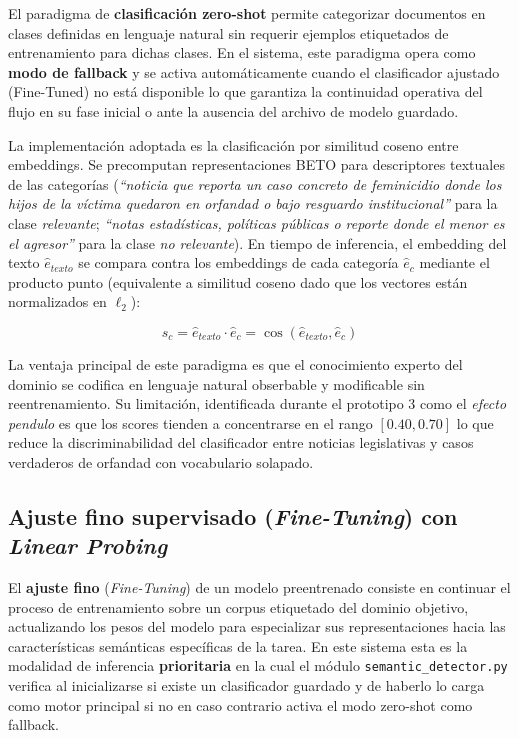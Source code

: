 El paradigma de \textbf{clasificación zero-shot} \cite{yin2019benchmarking} permite
categorizar documentos en clases definidas en lenguaje natural sin requerir
ejemplos etiquetados de entrenamiento para dichas clases. En el sistema, este
paradigma opera como \textbf{modo de fallback} y se activa automáticamente cuando
el clasificador ajustado (Fine-Tuned) no está disponible lo que garantiza la
continuidad operativa del flujo en su fase inicial o ante la ausencia del
archivo de modelo guardado.

La implementación adoptada es la clasificación por similitud coseno entre embeddings.
Se precomputan representaciones BETO para descriptores textuales de las categorías
(\textit{``noticia que reporta un caso concreto de feminicidio donde los hijos de
la víctima quedaron en orfandad o bajo resguardo institucional''} para la clase
\textit{relevante}; \textit{``notas estadísticas, políticas públicas o reporte donde
el menor es el agresor''} para la clase \textit{no relevante}). En tiempo de
inferencia, el embedding del texto $\hat{e}_{texto}$ se compara contra los
embeddings de cada categoría $\hat{e}_{c}$ mediante el producto punto (equivalente
a similitud coseno dado que los vectores están normalizados en $\ell_2$):

\begin{equation}
    s_c = \hat{e}_{texto} \cdot \hat{e}_c = \cos(\hat{e}_{texto}, \hat{e}_c)
\end{equation}

La ventaja principal de este paradigma es que el conocimiento experto del dominio
se codifica en lenguaje natural obserbable y modificable sin reentrenamiento. Su
limitación, identificada durante el prototipo 3 como el \textit{efecto pendulo}
es que los scores tienden a concentrarse en el rango $[0.40, 0.70]$ lo que reduce
la discriminabilidad del clasificador entre noticias
legislativas y casos verdaderos de orfandad con vocabulario solapado.



\subsection{Ajuste fino supervisado (\textit{Fine-Tuning}) con \textit{Linear Probing}}
\label{subsec:mt_finetuning}


El \textbf{ajuste fino} (\textit{Fine-Tuning}) \cite{devlin2019bert} de un modelo
preentrenado consiste en continuar el proceso de entrenamiento sobre un corpus
etiquetado del dominio objetivo, actualizando los pesos del modelo para especializar
sus representaciones hacia las características semánticas específicas de la tarea.
En este sistema esta es la modalidad de inferencia \textbf{prioritaria} en la cual el módulo
\texttt{semantic\_detector.py} verifica al inicializarse si existe un clasificador
guardado y de haberlo lo carga como motor principal si no en caso contrario activa
el modo zero-shot como fallback.

